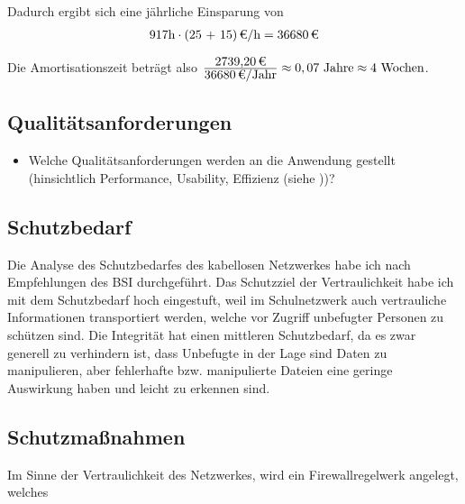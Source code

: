 Dadurch ergibt sich eine jährliche Einsparung von 
\begin{eqnarray}
917 \mbox{h} \cdot \eur{(25 + 15)}{\mbox{/h}} = \eur{36680}
\end{eqnarray}

Die Amortisationszeit beträgt also $\frac{\eur{2739,20}}{\eur{36680}\mbox{/Jahr}} \approx 0,07 \mbox{ Jahre} \approx 4 \mbox{ Wochen}$.

\subsection{Qualitätsanforderungen}
\label{sec:Qualitaetsanforderungen}
\begin{itemize}
	\item Welche Qualitätsanforderungen werden an die Anwendung gestellt (\zB hinsichtlich Performance, Usability, Effizienz \etc (siehe \citet{ISO9126}))?
\end{itemize}

\subsection{Schutzbedarf}
\label{sec:Schutzbedarf}
Die Analyse des Schutzbedarfes des kabellosen Netzwerkes habe ich nach Empfehlungen des \ac{BSI} durchgeführt. Das Schutzziel der Vertraulichkeit habe ich mit dem Schutzbedarf hoch eingestuft, weil im Schulnetzwerk auch vertrauliche Informationen transportiert werden, welche vor Zugriff unbefugter Personen zu schützen sind. Die Integrität hat einen mittleren Schutzbedarf, da es zwar generell zu verhindern ist, dass Unbefugte in der Lage sind Daten zu manipulieren, aber fehlerhafte bzw. manipulierte Dateien eine geringe Auswirkung haben und leicht zu erkennen sind.


\begin{comment}
	\item Welcher Schutzbedarf  wird an die Anwendung gestellt (\zB hinsichtlich Sicherheit, Wichtigtkeit, ... \etc (siehe \citet{BSI-S-200-2}))?
\end{comment}

\subsection{Schutzmaßnahmen}
\label{sec:Schutzmaßnahmen}
Im Sinne der Vertraulichkeit des Netzwerkes, wird ein Firewallregelwerk angelegt, welches 
\begin{comment}
	\item Welche Schutznahmen werden unternommen um das System abzichern (\zB gegenüber fremden Zugriff, Sicherheitslücken, Updates, Ausfall des Systems \etc)?
\end{comment}

